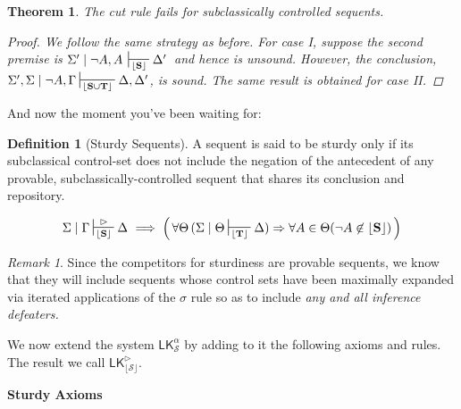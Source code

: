 \documentclass{article}                     %
\theoremstyle{theorem}
\newtheorem{theorem}{Theorem}
\theoremstyle{corollary}
\theoremstyle{lemma}
\theoremstyle{definition}
\newtheorem{definition}[section]{Definition}
\theoremstyle{remark}
\newtheorem{remark}{Remark}
\theoremstyle{definition}
\theoremstyle{notation}
\theoremstyle{definition}
\theoremstyle{proposition}
\theoremstyle{definition}
\begin{document}
\begin{theorem}
The cut rule fails for subclassically controlled sequents.

\begin{proof}
We follow the same strategy as before. For case I, suppose the second premise is $\Sigma'\mid\neg A ,A \,\sststile{\lfloor\mathbf{S}\rfloor}{} \Delta'\,$ and hence is unsound. However, the conclusion, $ \Sigma',\Sigma\mid\neg A,\Gamma\sststile{\lfloor\mathbf{S\cup T}\rfloor}{}\Delta, \Delta'$, is sound. The same result is obtained for case II.
\end{proof}
\end{theorem}

\vspace{3mm}

\begin{framed}
	And now the moment you've been waiting for:
\end{framed}


\begin{definition}[Sturdy Sequents]\label{SturdySeq}
A sequent is said to be sturdy only if its subclassical control-set does not include the negation of the antecedent of any provable, subclassically-controlled sequent that shares its conclusion and repository.

\begin{equation}
\Sigma\mid\Gamma\sststile{\mathbf{\lfloor\mathbf{S}\rfloor}}{\rhd} \Delta \,\,\Longrightarrow\hspace{1mm} 
\Big(\, \forall \Theta\,(\Sigma\mid\Theta\sststile{\mathbf{\lfloor\mathbf{T}\rfloor}}{} \Delta) \Rightarrow \forall A \in \Theta( \neg A \not\in\lfloor\mathbf{S}\rfloor)\,\Big)
\end{equation}
\end{definition}

\begin{remark}
Since the competitors for sturdiness are provable sequents, we know that they will include sequents whose control sets have been maximally expanded via iterated applications of the $ \sigma $ rule so as to include \textit{any and all inference defeaters.} 
\end{remark}



We now extend the system $ \mathsf{LK}^\alpha_\mathcal{S} $ by adding to it the following axioms and rules. The result we call $ \mathsf{LK}^\rhd_\mathcal{\lfloor S \rfloor} $.  

\vspace{2mm}
\textbf{Sturdy Axioms}
\vspace{.5cm}
\end{document}
